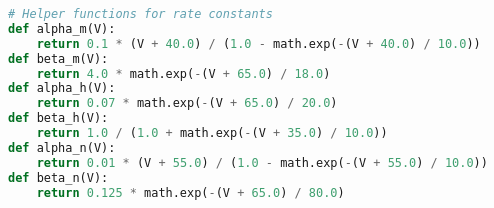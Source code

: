 \begin{lstlisting}[language=Python, caption={Helper functions representing the $\alpha$ and $\beta$}, label={lst:hodgkin-huxleymodelHelper}]
# Helper functions for rate constants
def alpha_m(V):
	return 0.1 * (V + 40.0) / (1.0 - math.exp(-(V + 40.0) / 10.0))
def beta_m(V):
	return 4.0 * math.exp(-(V + 65.0) / 18.0)
def alpha_h(V):
	return 0.07 * math.exp(-(V + 65.0) / 20.0)
def beta_h(V):
	return 1.0 / (1.0 + math.exp(-(V + 35.0) / 10.0))
def alpha_n(V):
	return 0.01 * (V + 55.0) / (1.0 - math.exp(-(V + 55.0) / 10.0))
def beta_n(V):
	return 0.125 * math.exp(-(V + 65.0) / 80.0)
\end{lstlisting}